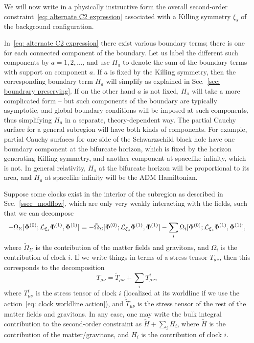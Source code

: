 \documentclass[]{jkpaper}
\theoremstyle{plain}
\theoremstyle{definition}
\begin{document}
We will now write in a physically instructive form the overall second-order constraint~\eqref{eq: alternate C2 expression} associated with a Killing symmetry $\xi_s$ of the background configuration.

In~\eqref{eq: alternate C2 expression} there exist various boundary terms; there is one for each connected component of the boundary. Let us label the different such components by $a=1,2,\dots$, and use $H_a$ to denote the sum of the boundary terms with support on component $a$. If $a$ is fixed by the Killing symmetry, then the corresponding boundary term $H_a$ will simplify as explained in Sec.~\ref{sec: boundrary preserving}. If on the other hand $a$ is not fixed, $H_a$ will take a more complicated form -- but such components of the boundary are typically asymptotic, and global boundary conditions will be imposed at such components, thus simplifying $H_a$ in a separate, theory-dependent way. The partial Cauchy surface for a general subregion will have both kinds of components. For example, partial Cauchy surfaces for one side of the Schwarzschild black hole have one boundary component at the bifurcate horizon, which is fixed by the horizon generating Killing symmetry, and another  component at spacelike infinity, which is not. In general relativity, $H_a$ at the bifurcate horizon will be proportional to its area, and $H_a$ at spacelike infinity will be the ADM Hamiltonian.

Suppose some clocks exist in the interior of the subregion as described in Sec.~\ref{ssec_modflow}, which are only very weakly interacting with the fields, such that we can decompose
\begin{equation}
    -\Omega_\Sigma[\Phi^{(0)};\mathcal{L}_{\xi_s}\Phi^{(1)},\Phi^{(1)}] = -\tilde\Omega_\Sigma[\Phi^{(0)};\mathcal{L}_{\xi_s}\Phi^{(1)},\Phi^{(1)}]
    -\sum_i\Omega_i[\Phi^{(0)};\mathcal{L}_{\xi_s}\Phi^{(1)},\Phi^{(1)}],
\end{equation}
where $\tilde\Omega_\Sigma$ is the contribution of the matter fields and gravitons, and $\Omega_i$ is the contribution of clock $i$. If we write things in terms of a stress tensor $T_{\mu\nu}$, then this corresponds to the decomposition
\begin{equation}
    T_{\mu\nu} = \tilde{T}_{\mu\nu} + \sum_i T^i_{\mu\nu},
\end{equation}
where $T^i_{\mu\nu}$ is the stress tensor of clock $i$ (localized at its worldline if we use the action~\eqref{eq: clock worldline action}), and $\tilde{T}_{\mu\nu}$ is the stress tensor of the rest of the matter fields and gravitons. In any case, one may write the bulk integral contribution to the second-order constraint as $\tilde{H}+\sum_i H_i$, where $\tilde{H}$ is the contribution of the matter/gravitons, and $H_i$ is the contribution of clock $i$.
\end{document}
